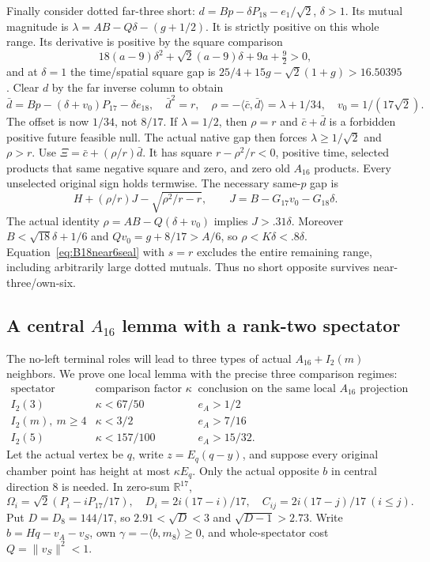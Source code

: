\documentclass[11pt]{article}
\theoremstyle{definition}
\theoremstyle{remark}
\newcommand{\ip}[2]{\langle #1,#2\rangle}
\newcommand{\norm}[1]{\lVert #1\rVert}
\begin{document}
Finally consider dotted far-three short:
\(d=Bp-\delta P_{18}-e_1/\sqrt2\), \(\delta>1\).
Its mutual magnitude is
\(\lambda=AB-Q\delta-(g+1/2)\).
It is strictly positive on this whole range.
Its derivative is positive by the square comparison
\[
 18(a-9)\delta^2+\sqrt2(a-9)\delta+9a+\tfrac92>0 ,
\]
and at \(\delta=1\) the time/spatial square gap is
\(25/4+15g-\sqrt2(1+g)>16.50395\).
Clear \(d\) by the far inverse column to obtain
\[
 \bar d=Bp-(\delta+v_0)P_{17}-\delta e_{18},\quad
 \bar d^2=r,\quad
 \rho=-\ip{\bar c}{\bar d}=\lambda+1/34,\quad
 v_0=1/(17\sqrt2).
\]
The offset is now \(1/34\), not \(8/17\).
If \(\lambda=1/2\), then \(\rho=r\) and
\(\bar c+\bar d\) is a forbidden positive future feasible null.
The actual native gap then forces \(\lambda\geq1/\sqrt2\)
and \(\rho>r\).
Use \(\Xi=\bar c+(\rho/r)\bar d\).
It has square \(r-\rho^2/r<0\), positive time,
selected products that same negative square and zero, and zero
old \(A_{16}\) products. Every unselected original sign holds
termwise. The necessary same-\(p\) gap is
\[
 H+(\rho/r)J-\sqrt{\rho^2/r-r},\qquad
 J=B-G_{17}v_0-G_{18}\delta .
\]
The actual identity \(\rho=AB-Q(\delta+v_0)\) implies
\(J>.31\delta\). Moreover \(B<\sqrt{18}\delta+1/6\) and
\(Qv_0=g+8/17>A/6\), so \(\rho<K\delta<.8\delta\).
Equation~\eqref{eq:B18near6seal} with \(s=r\) excludes the
entire remaining range, including arbitrarily large dotted mutuals.
Thus no short opposite survives near-three/own-six.

\subsection{A central \(A_{16}\) lemma with a rank-two spectator}
\label{app:B18localA16}
The no-left terminal roles will lead to three types of actual
\(A_{16}+I_2(m)\) neighbors. We prove one local lemma with the
precise three comparison regimes:
\[
\begin{array}{c|c|c}
\text{spectator}&\text{comparison factor }\kappa&
 \text{conclusion on the same local \(A_{16}\) projection}\\ \hline
 I_2(3)&\kappa<67/50&e_A>1/2\\
 I_2(m),\ m\geq4&\kappa<3/2&e_A>7/16\\
 I_2(5)&\kappa<157/100&e_A>15/32 .
\end{array}
\]
Let the actual vertex be \(q\), write \(z=E_q(q-y)\), and suppose
every original chamber point has height at most \(\kappa E_q\).
Only the actual opposite \(b\) in central direction \(8\) is needed.
In zero-sum \(\mathbb R^{17}\),
\[
 \Omega_i=\sqrt2(P_i-iP_{17}/17),\quad
 D_i=2i(17-i)/17,\quad C_{ij}=2i(17-j)/17\ (i\leq j).
\]
Put \(D=D_8=144/17\), so \(2.91<\sqrt D<3\) and
\(\sqrt{D-1}>2.73\).
Write \(b=Hq-v_A-v_S\), own \(\gamma=-\ip b{m_8}\geq0\),
and whole-spectator cost \(Q=\norm{v_S}^2<1\).
\end{document}
